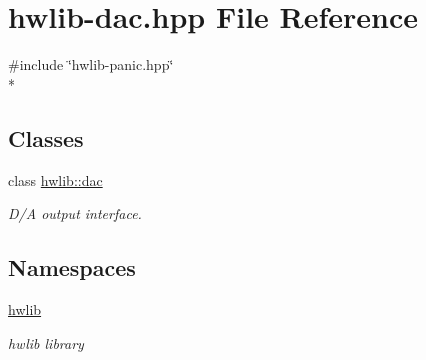 \hypertarget{hwlib-dac_8hpp}{}\section{hwlib-\/dac.hpp File Reference}
\label{hwlib-dac_8hpp}
{\ttfamily \#include \char`\"{}hwlib-\/panic.\+hpp\char`\"{}}\\*
\subsection*{Classes}
\begin{DoxyCompactItemize}
\item 
class \hyperlink{classhwlib_1_1dac}{hwlib\+::dac}
\begin{DoxyCompactList}\small\item\em D/A output interface. \end{DoxyCompactList}\end{DoxyCompactItemize}
\subsection*{Namespaces}
\begin{DoxyCompactItemize}
\item 
 \hyperlink{namespacehwlib}{hwlib}
\begin{DoxyCompactList}\small\item\em hwlib library \end{DoxyCompactList}\end{DoxyCompactItemize}
